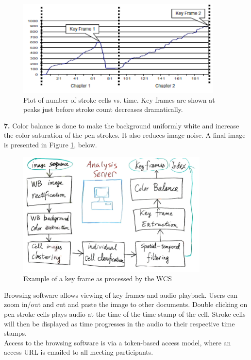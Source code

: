 \documentclass{article}
\begin{document}
\begin{figure}[H]
\centering
\includegraphics[scale=1]{images/research_mswhiteboard_3}
\caption{Plot of number of stroke cells vs. time.  Key frames are shown at peaks just before stroke count decreases dramatically.}
\end{figure}

\indent \textbf{7.} Color balance is done to make the background uniformly white and increase the color saturation of the pen strokes.  It also reduces image noise.  A final image is presented in Figure \ref{fig:research_mswhiteboard_2}, below.

\begin{figure}[H]
\centering
\includegraphics[scale=1]{images/research_mswhiteboard_2}
\caption{Example of a key frame as processed by the WCS}
\label{fig:research_mswhiteboard_2}
\end{figure}

\indent Browsing software allows viewing of key frames and audio playback.  Users can zoom in/out and cut and paste the image to other documents.  Double clicking on pen stroke cells plays audio at the time of the time stamp of the cell.  Stroke cells will then be displayed as time progresses in the audio to their respective time stamps. \\
\indent Access to the browsing software is via a token-based access model, where an access URL is emailed to all meeting participants.
\end{document}
